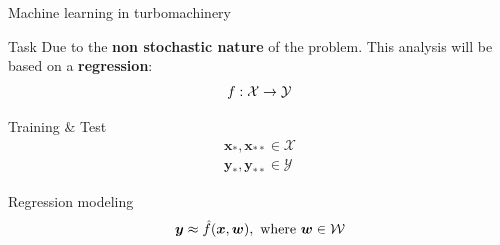 \begin{frame}{Machine learning in turbomachinery}
    \begin{block}{Task}
        Due to the \textbf{non stochastic nature} of the problem. This analysis will be based on a \textbf{regression}: 
        \begin{equation*}
            \mathnormal{f}: \mathcal{X} \rightarrow \mathcal{Y}
        \end{equation*}
    \end{block}
    \begin{block}{Training \& Test}
        \vspace{-0.5cm}
        \begin{align*}
            \boldsymbol{x_*}, \boldsymbol{x_{**}} \in \mathcal{X} \\
            \boldsymbol{y_*}, \boldsymbol{y_{**}} \in \mathcal{Y}
        \end{align*}
    \end{block}
    \begin{block}{Regression modeling}
        \begin{equation*}
            \boldsymbol{y} \approx \hat{\mathnormal{f}}(\boldsymbol{x}, \boldsymbol{w}), \text{ where } \boldsymbol{w} \in \mathcal{W}
        \end{equation*}
    \end{block}
\end{frame}

